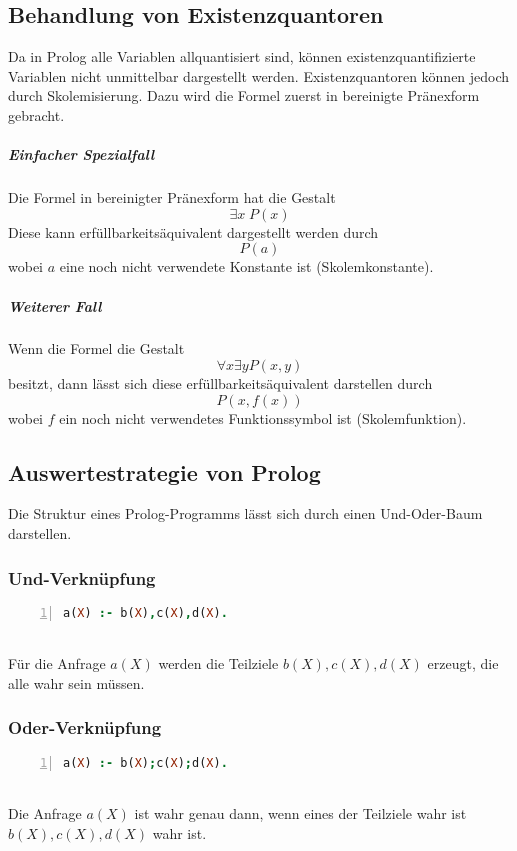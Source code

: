 \documentclass[a4paper]{scrartcl}
\begin{document}
\subsection{Behandlung von Existenzquantoren}
Da in Prolog alle Variablen allquantisiert sind, können existenzquantifizierte Variablen nicht unmittelbar dargestellt werden. Existenzquantoren können jedoch durch Skolemisierung. Dazu wird die Formel zuerst in bereinigte Pränexform gebracht.
\subparagraph{Einfacher Spezialfall} Die Formel in bereinigter Pränexform hat die Gestalt \[\exists x \; P(x)\]
Diese kann erfüllbarkeitsäquivalent dargestellt werden durch \[P(a)\] wobei $a$ eine noch nicht verwendete Konstante ist (Skolemkonstante).
\subparagraph{Weiterer Fall} Wenn die Formel die Gestalt
\[\forall x \exists y P(x,y)\]
besitzt, dann lässt sich diese erfüllbarkeitsäquivalent darstellen durch
\[P(x,f(x))\]
wobei $f$ ein noch nicht verwendetes Funktionssymbol ist (Skolemfunktion).

\subsection{Auswertestrategie von Prolog}
Die Struktur eines Prolog-Programms lässt sich durch einen Und-Oder-Baum darstellen.
\subsubsection{Und-Verknüpfung}
\begin{lstlisting}[numbers=left, tabsize=4, language=Prolog]
a(X) :- b(X),c(X),d(X).
\end{lstlisting}
\\
Für die Anfrage $a(X)$ werden die Teilziele $b(X),c(X),d(X)$ erzeugt, die alle wahr sein müssen.
\subsubsection{Oder-Verknüpfung}
\begin{lstlisting}[numbers=left, tabsize=4, language=Prolog]
a(X) :- b(X);c(X);d(X).
\end{lstlisting}
\\
Die Anfrage $a(X)$ ist wahr genau dann, wenn eines der Teilziele wahr ist $b(X),c(X),d(X)$ wahr ist.
\end{document}
